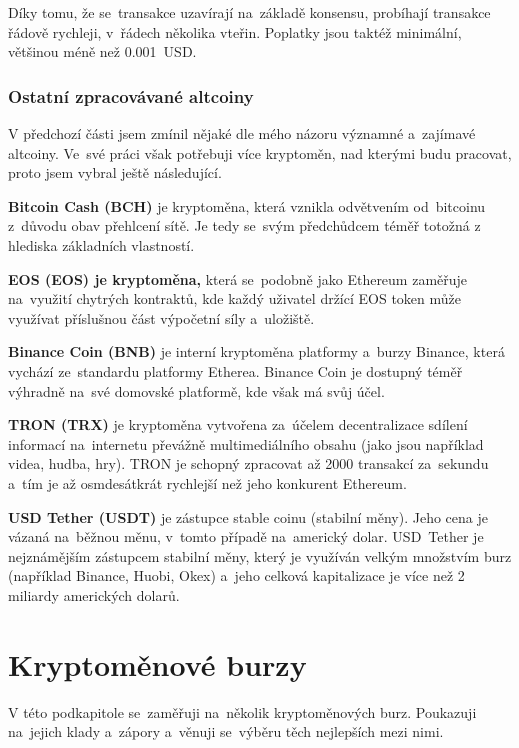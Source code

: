 \documentclass[thesis=B,czech]{FITthesis}[2019/03/21]
\begin{document}
Díky tomu, že se~transakce uzavírají na~základě konsensu, probíhají transakce řádově rychleji, v~řádech několika vteřin. Poplatky jsou taktéž minimální, většinou méně než 0.001~USD. \cite{bitinfocharts, coincodex_ripple} 

\subsubsection{Ostatní zpracovávané altcoiny}
V předchozí části jsem zmínil nějaké dle mého názoru významné a~zajímavé altcoiny. Ve~své práci však potřebuji více kryptoměn, nad kterými budu pracovat, proto jsem vybral ještě následující.

\textbf{Bitcoin Cash (BCH)} je kryptoměna, která vznikla odvětvením od~bitcoinu z~důvodu obav přehlcení sítě. Je tedy se~svým předchůdcem téměř totožná z hlediska základních vlastností. \cite{kurzy_bch}

\textbf{EOS (EOS) je kryptoměna,} která se~podobně jako Ethereum zaměřuje na~využití chytrých kontraktů, kde každý uživatel držící EOS token může využívat příslušnou část výpočetní síly a~uložiště. \cite{finex_eos}

\textbf{Binance Coin (BNB)} je interní kryptoměna platformy a~burzy Binance, která vychází ze~standardu platformy Etherea. Binance Coin je dostupný téměř výhradně na~své domovské platformě, kde však má svůj účel. \cite{martin_sistek_bnb}

\textbf{TRON (TRX)} je kryptoměna vytvořena za~účelem decentralizace sdílení informací na~internetu převážně multimediálního obsahu (jako jsou například videa, hudba, hry). TRON je schopný zpracovat až 2000 transakcí za~sekundu a~tím je až osmdesátkrát rychlejší než jeho konkurent Ethereum. \cite{finex_trx}

\textbf{USD Tether (USDT)} je zástupce stable coinu (stabilní měny). Jeho cena je vázaná na~běžnou měnu, v~tomto případě na~americký dolar. USD~Tether je nejznámějším zástupcem stabilní měny, který je využíván velkým množstvím burz (například Binance, Huobi, Okex) a~jeho celková kapitalizace je více než 2 miliardy amerických dolarů. \cite{mlady_investor_stable_coin} 

\section{Kryptoměnové burzy}
\label{cryptocurrency_exchanges}
V této podkapitole se~zaměřuji na~několik kryptoměnových burz. Poukazuji na~jejich klady a~zápory a~věnuji se~výběru těch nejlepších mezi nimi.
\end{document}
